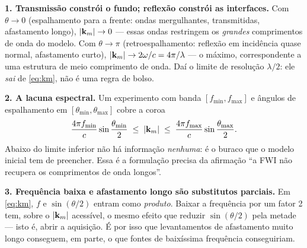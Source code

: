 \documentclass[11pt,a4paper,oneside]{report}
\begin{document}
\begin{teoria}
\textbf{1. Transmiss\~ao constr\'oi o fundo; reflex\~ao constr\'oi as
interfaces.} Com $\theta \to 0$ (espalhamento para a frente: ondas
mergulhantes, transmitidas, afastamento longo), $\lvert \mathbf{k}_m \rvert\to 0$ ---
essas ondas restringem os \emph{grandes} comprimentos de onda do modelo. Com
$\theta \to \pi$ (retroespalhamento: reflex\~ao em incid\^encia quase normal,
afastamento curto), $\lvert \mathbf{k}_m \rvert \to 2\omega/c = 4\pi/\lambda$ --- o
m\'aximo, correspondente a uma estrutura de meio comprimento de onda. Da\'i o
limite de resolu\c{c}\~ao $\lambda/2$: ele \emph{sai} de \eqref{eq:km}, n\~ao
\'e uma regra de bolso.

\textbf{2. A lacuna espectral.} Um experimento com banda $[f_{\min},f_{\max}]$
e \^angulos de espalhamento em $[\theta_{\min},\theta_{\max}]$ cobre a coroa
\[
\frac{4\pi f_{\min}}{c}\sin\frac{\theta_{\min}}{2}
\;\le\; \lvert \mathbf{k}_m \rvert \;\le\;
\frac{4\pi f_{\max}}{c}\sin\frac{\theta_{\max}}{2}.
\]
Abaixo do limite inferior n\~ao h\'a informa\c{c}\~ao \emph{nenhuma}: \'e o
buraco que o modelo inicial tem de preencher. Essa \'e a formula\c{c}\~ao
precisa da afirma\c{c}\~ao ``a FWI n\~ao recupera os comprimentos de onda
longos''.

\textbf{3. Frequ\^encia baixa e afastamento longo s\~ao substitutos
parciais.} Em \eqref{eq:km}, $f$ e $\sin(\theta/2)$ entram como
\emph{produto}. Baixar a frequ\^encia por um fator 2 tem, sobre o
$\lvert \mathbf{k}_m \rvert$ acess\'ivel, o mesmo efeito que reduzir $\sin(\theta/2)$
pela metade --- isto \'e, abrir a aquisi\c{c}\~ao. \'E por isso que
levantamentos de afastamento muito longo conseguem, em parte, o que fontes de
baix\'issima frequ\^encia conseguiriam.
\end{teoria}

\begin{center}
\end{center}
\end{document}
